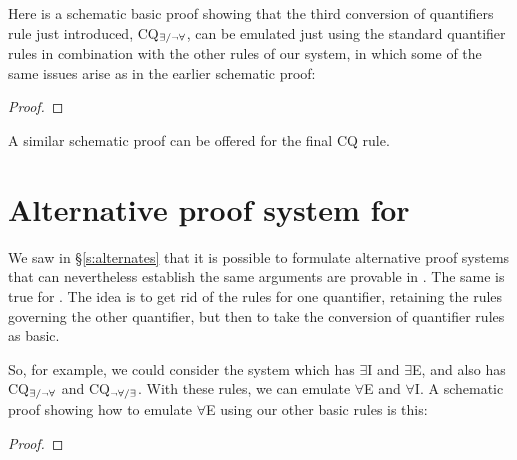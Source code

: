 Here is a schematic basic proof showing that the third conversion of quantifiers rule just introduced, CQ$_{\exists/\neg\forall}$, can be emulated just using the standard quantifier rules in combination with the other rules of our system, in which some of the same issues arise as in the earlier schematic proof: 
\begin{proof}
	\open
		\open
			\open
			\close
		\close
	\close
\end{proof}
A similar schematic proof can be offered for the final CQ rule.

\section{Alternative proof system for \FOL}

We saw in §\ref{s:alternates} that it is possible to formulate alternative proof systems that can nevertheless establish the same arguments are provable in \TFL. The same is true for \FOL. The idea is to get rid of the rules for one quantifier, retaining the rules governing the other quantifier, but then to take the conversion of quantifier rules as basic. 

So, for example, we could consider the system which has $\exists$I and $\exists$E, and also has CQ$_{\exists/\neg\forall}$ and CQ$_{\neg\forall/\exists}$. With these rules, we can emulate $\forall$E and $\forall$I. A schematic proof showing how to emulate $\forall$E using our other basic rules is this:
\begin{proof}
	\open
	\close
\end{proof}

